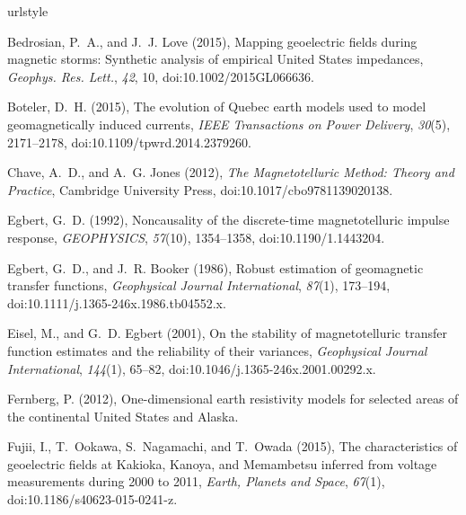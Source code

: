 \documentclass[linenumbers,draft]{agujournal}
\begin{document}
%
%
\begin{thebibliography}{28}
\providecommand{\natexlab}[1]{#1}
\expandafter\ifx\csname urlstyle\endcsname\relax
  \providecommand{\doi}[1]{doi:\discretionary{}{}{}#1}\else
  \providecommand{\doi}{doi:\discretionary{}{}{}\begingroup
  \urlstyle{rm}\Url}\fi

{Bedrosian}, P.~A., and J.~J. {Love} (2015), {Mapping geoelectric fields during
  magnetic storms: Synthetic analysis of empirical United States impedances},
  \textit{Geophys. Res. Lett.}, \textit{42}, 10, \doi{10.1002/2015GL066636}.

Boteler, D.~H. (2015), The evolution of {Q}uebec earth models used to model
  geomagnetically induced currents, \textit{{IEEE} Transactions on Power
  Delivery}, \textit{30}(5), 2171--2178, \doi{10.1109/tpwrd.2014.2379260}.

Chave, A.~D., and A.~G. Jones (2012), \textit{The Magnetotelluric Method:
  Theory and Practice}, Cambridge University Press,
  \doi{10.1017/cbo9781139020138}.

Egbert, G.~D. (1992), Noncausality of the discrete-time magnetotelluric impulse
  response, \textit{{GEOPHYSICS}}, \textit{57}(10), 1354--1358,
  \doi{10.1190/1.1443204}.

Egbert, G.~D., and J.~R. Booker (1986), Robust estimation of geomagnetic
  transfer functions, \textit{Geophysical Journal International},
  \textit{87}(1), 173--194, \doi{10.1111/j.1365-246x.1986.tb04552.x}.

Eisel, M., and G.~D. Egbert (2001), On the stability of magnetotelluric
  transfer function estimates and the reliability of their variances,
  \textit{Geophysical Journal International}, \textit{144}(1), 65--82,
  \doi{10.1046/j.1365-246x.2001.00292.x}.

Fernberg, P. (2012), One-dimensional earth resistivity models for selected
  areas of the continental {U}nited {S}tates and {A}laska.

Fujii, I., T.~Ookawa, S.~Nagamachi, and T.~Owada (2015), The characteristics of
  geoelectric fields at {K}akioka, {K}anoya, and {M}emambetsu inferred from
  voltage measurements during 2000 to 2011, \textit{Earth, Planets and Space},
  \textit{67}(1), \doi{10.1186/s40623-015-0241-z}.


\end{thebibliography}
\end{document}
